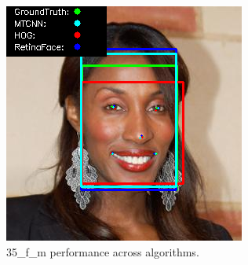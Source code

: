 \documentclass{l4proj}
\begin{document}
\begin{appendices}
\begin{figure}[h!]
\begin{minipage}{0.49\textwidth}
     \includegraphics[width=\textwidth]{images/appendix/35.png}
    \caption{35\_f\_m performance across algorithms.}
    \label{whoopi_result}
  \end{minipage}
\end{figure}


\end{appendices}
\end{document}
